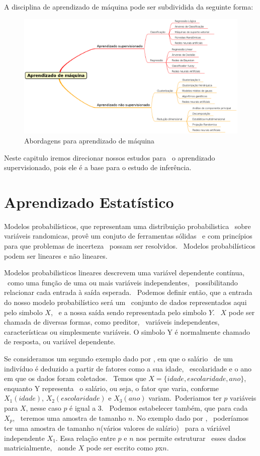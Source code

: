 A disciplina de aprendizado de máquina pode ser subdividida da seguinte forma:
\begin{figure}[h]
	\centering
	\label{fig01}
        \includegraphics[scale=0.48]{figuras/mind1.eps}
	\caption{Abordagens para aprendizado de máquina}
\end{figure}
Neste capitulo iremos direcionar nossos estudos para \
o aprendizado supervisionado, pois ele é a base para o estudo de inferência.

\section{Aprendizado Estatístico}

Modelos probabilísticos, que representam uma distribuição probabilistica \
sobre variáveis randomicas, provê um conjuto de ferramentas sólidas \
e com princípios para que problemas de incerteza \
possam ser resolvidos\cite{Sun}. \
Modelos probabilísticos podem ser lineares e não lineares.

Modelos probabilisticos lineares descrevem uma variável dependente contínua, \
como uma função de uma ou mais variáveis independentes, \
possibilitando relacionar cada entrada à saída esperada. \
Podemos definir então, que a entrada do nosso modelo probabilístico será um \
conjunto de dados representados aqui pelo simbolo $X$, \
e a nossa saída sendo representada pelo simbolo $Y$.  \
$X$ pode ser chamada de diversas formas, como preditor, \
variáveis independentes, características ou simplesmente variáveis.
O simbolo Y é normalmente chamado de resposta, ou variável dependente. \

Se consideramos um segundo exemplo dado por \cite{James}, em que o salário \
de um indivíduo é deduzido a partir de fatores como a sua idade, \
escolaridade e o ano em que os dados foram coletados. \
Temos que $X = \{idade, escolaridade, ano\}$, enquanto Y representa \
o salário, ou seja, o fator que varia, conforme $X_1(idade)$,
$X_2(escolaridade)$ e $X_3(ano)$ variam.\
Poderiamos ter $p$ variáveis para $X$, nesse caso $p$ é igual a 3. \
Podemos estabelecer também, que para cada $X_p$, \
teremos uma amostra de tamanho $n$. No exemplo dado por \cite{James}, \
poderíamos ter uma amostra de tamanho $n$(vários valores de salário) \
para a váriável independente $X_1$.
Essa relação entre $p$ e $n$ nos permite estruturar \
esses dados matricialmente, \
aonde $X$ pode ser escrito como $p$x$n$\cite{James}.


